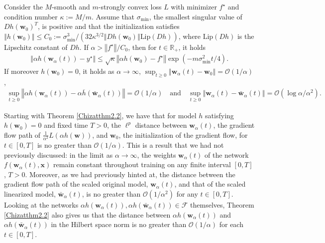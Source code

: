 \documentclass{article}
\newenvironment{manualtheorem}[1]{%
  \renewcommand\themanualtheoreminner{#1}%
  \manualtheoreminner
}{\endmanualtheoreminner}
\begin{document}
\begin{manualtheorem}{2.4}[from \cite{chizat2018lazy}]\label{Chizatthm2.4}
Consider the $M$-smooth and $m$-strongly convex loss $L$ with minimizer $f^{\star}$ and condition number $\kappa := M/m$. Assume that $\sigma_{\text{min}}$, the smallest singular value of $Dh(\boldsymbol{w}_0)^T$, is positive and that the initialization satisfies $\left\Vert h(\boldsymbol{w}_0) \right\Vert \leq C_0:= \sigma_{\text{min}}^3/(32\kappa^{3/2} \left\Vert Dh(\boldsymbol{w}_0) \right\Vert \text{Lip}(Dh))$, where $\text{Lip}(Dh)$ is the Lipschitz constant of $Dh$. If $\alpha > \left\Vert f^{\star} \right\Vert / C_0$, then for $t \in \mathbb{R}_+$, it holds
\begin{align*}
    \left\Vert \alpha h(\boldsymbol{w}_{\alpha}(t)) - y^{\star} \right\Vert \leq \sqrt{\kappa} \left\Vert \alpha h(\boldsymbol{w}_0) - f^{\star} \right\Vert \exp( -m \sigma_{\text{min}}^2 t/4).
\end{align*}
If moreover $h(\boldsymbol{w}_0) = 0$, it holds as $\alpha \rightarrow \infty$, $\sup_{t \geq 0} \left\Vert \boldsymbol{w}_{\alpha}(t) - \boldsymbol{w}_0 \right\Vert = \mathcal{O}(1/\alpha)$,
\begin{align*}
    \sup_{t \geq 0} \left\Vert \alpha h(\boldsymbol{w}_{\alpha}(t)) - \alpha \overline{h}(\boldsymbol{\bar{w}}_{\alpha}(t)) \right\Vert = \mathcal{O}(1/\alpha) \quad \text{and} \quad  \sup_{t \geq 0} \left\Vert \boldsymbol{w}_{\alpha}(t) - \boldsymbol{\bar{w}}_{\alpha}(t) \right\Vert = \mathcal{O}(\log \alpha/\alpha^2).
\end{align*}
\end{manualtheorem}

Starting with Theorem \ref{Chizatthm2.2}, we have that for model $h$ satisfying $h(\boldsymbol{w}_0) = 0$ and fixed time $T > 0$, the $\ell^p$ distance between $\boldsymbol{w}_{\alpha}(t)$, the gradient flow path of $\frac{1}{\alpha^2} L(\alpha h(\boldsymbol{w}))$, and $\boldsymbol{w}_0$, the initialization of the gradient flow, for $t \in [0, T]$ is no greater than $\mathcal{O}(1/\alpha)$. This is a result that we had not previously discussed: in the limit as $\alpha \rightarrow \infty$, the weights $\boldsymbol{w}_{\alpha}(t)$ of the network $f(\boldsymbol{w}_{\alpha}(t), \boldsymbol{x})$ remain constant throughout training on any finite interval $[0, T]$, $T > 0$. Moreover, as we had previously hinted at, the distance between the gradient flow path of the scaled original model, $\boldsymbol{w}_{\alpha}(t)$, and that of the scaled linearized model, $\boldsymbol{\bar{w}}_{\alpha}(t)$, is no greater than $\mathcal{O}(1/\alpha^2)$ for any $t \in [0, T]$. Looking at the networks $\alpha h(\boldsymbol{w}_{\alpha}(t)), \alpha h(\boldsymbol{\bar{w}}_{\alpha}(t)) \in \mathcal{F}$ themselves, Theorem \ref{Chizatthm2.2} also gives us that the distance between $\alpha h(\boldsymbol{w}_{\alpha}(t))$ and $\alpha h(\boldsymbol{\bar{w}}_{\alpha}(t))$ in the Hilbert space norm is no greater than $\mathcal{O}(1/\alpha)$ for each $t \in [0, T]$.
\end{document}
